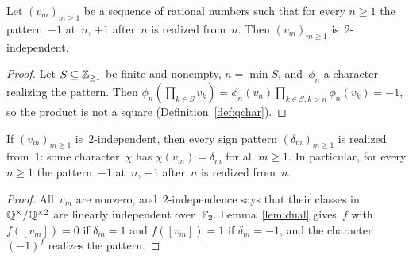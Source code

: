 \begin{proposition}
  \label{prop:crit}
  \leanok
  Let $(v_m)_{m \ge 1}$ be a sequence of rational numbers such that for every $n \ge 1$ the
  pattern~$-1$ at~$n$, $+1$ after~$n$ is realized from~$n$. Then $(v_m)_{m \ge 1}$
  is~$2$-independent. 
\end{proposition}
\begin{proof}
  \leanok
  Let $S \subseteq \mathbb{Z}_{\ge 1}$ be finite and nonempty, $n = \min S$, and~$\phi_n$ a character
  realizing the pattern. Then $\phi_n(\prod_{k \in S} v_k) = \phi_n(v_n) \prod_{k \in S, k > n}
  \phi_n(v_k) = -1$, so the product is not a square (Definition~\ref{def:qchar}).
\end{proof}

\begin{proposition}
  \label{prop:crit-converse}
  \leanok
  If $(v_m)_{m \ge 1}$ is~$2$-independent, then every sign pattern $(\delta_m)_{m \ge 1}$ is
  realized from~$1$: some character~$\chi$ has $\chi(v_m) = \delta_m$ for all $m \ge 1$. In
  particular, for every $n \ge 1$ the pattern~$-1$ at~$n$, $+1$ after~$n$ is realized from~$n$.
\end{proposition}
\begin{proof}
  \leanok
  All~$v_m$ are nonzero, and~$2$-independence says that their classes in
  $\mathbb{Q}^\times/\mathbb{Q}^{\times 2}$ are linearly independent over~$\mathbb{F}_2$. Lemma~\ref{lem:dual}
  gives~$f$ with $f([v_m]) = 0$ if $\delta_m = 1$ and $f([v_m]) = 1$ if $\delta_m = -1$, and the
  character $(-1)^f$ realizes the pattern.
\end{proof}

